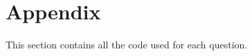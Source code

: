 \documentclass[10pt]{article}
\begin{document}
\section{Appendix}
This section contains all the code used for each question. 
\begin{comment}
\subsection{Question 3, parts (a) and (b)}

\end{comment}
\end{document}
